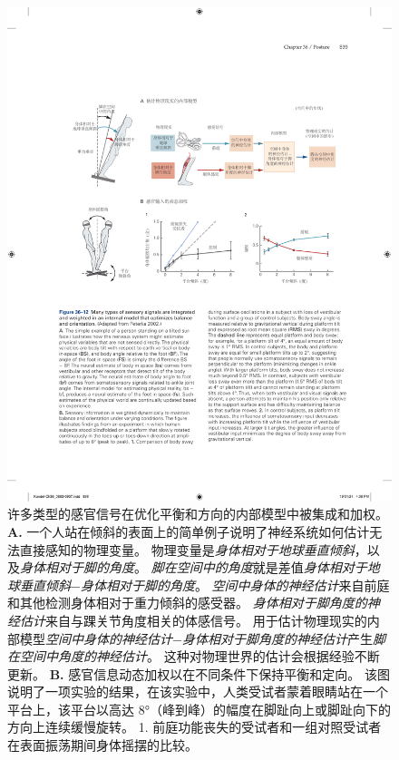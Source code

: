 \begin{figure}[htbp]
	\centering
	\includegraphics[width=1.0\linewidth]{chap36/fig_36_12}
	\caption{许多类型的感官信号在优化平衡和方向的内部模型中被集成和加权\cite{peterka2002sensorimotor}。
		\textbf{A.} 一个人站在倾斜的表面上的简单例子说明了神经系统如何估计无法直接感知的物理变量。
		物理变量是\textit{身体相对于地球垂直倾斜}，以及\textit{身体相对于脚的角度}。
		\textit{脚在空间中的角度}就是差值\textit{身体相对于地球垂直倾斜}−\textit{身体相对于脚的角度}。
		\textit{空间中身体的神经估计}来自前庭和其他检测身体相对于重力倾斜的感受器。
		\textit{身体相对于脚角度的神经估计}来自与踝关节角度相关的体感信号。
		用于估计物理现实的内部模型\textit{空间中身体的神经估计}−\textit{身体相对于脚角度的神经估计}产生\textit{脚在空间中角度的神经估计}。
		这种对物理世界的估计会根据经验不断更新。
		\textbf{B.} 感官信息动态加权以在不同条件下保持平衡和定向。
		该图说明了一项实验的结果，在该实验中，人类受试者蒙着眼睛站在一个平台上，该平台以高达 8°（峰到峰）的幅度在脚趾向上或脚趾向下的方向上连续缓慢旋转。
		1. 前庭功能丧失的受试者和一组对照受试者在表面振荡期间身体摇摆的比较。
}
\end{figure}
